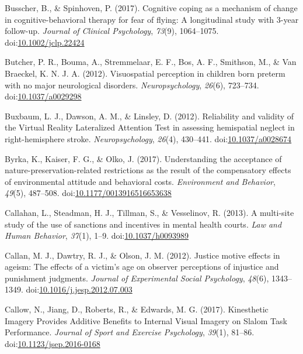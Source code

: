 \documentclass[english,man]{apa6}
\theoremstyle{definition}
\theoremstyle{definition}
\theoremstyle{definition}
\theoremstyle{remark}
\begin{document}
\hypertarget{ref-Busscher2017}{}
Busscher, B., \& Spinhoven, P. (2017). Cognitive coping as a mechanism
of change in cognitive-behavioral therapy for fear of flying: A
longitudinal study with 3-year follow-up. \emph{Journal of Clinical
Psychology}, \emph{73}(9), 1064--1075.
doi:\href{https://doi.org/10.1002/jclp.22424}{10.1002/jclp.22424}

\hypertarget{ref-Butcher2012}{}
Butcher, P. R., Bouma, A., Stremmelaar, E. F., Bos, A. F., Smithson, M.,
\& Van Braeckel, K. N. J. A. (2012). Visuospatial perception in children
born preterm with no major neurological disorders.
\emph{Neuropsychology}, \emph{26}(6), 723--734.
doi:\href{https://doi.org/10.1037/a0029298}{10.1037/a0029298}

\hypertarget{ref-Buxbaum}{}
Buxbaum, L. J., Dawson, A. M., \& Linsley, D. (2012). Reliability and
validity of the Virtual Reality Lateralized Attention Test in assessing
hemispatial neglect in right-hemisphere stroke. \emph{Neuropsychology},
\emph{26}(4), 430--441.
doi:\href{https://doi.org/10.1037/a0028674}{10.1037/a0028674}

\hypertarget{ref-Byrka2017}{}
Byrka, K., Kaiser, F. G., \& Olko, J. (2017). Understanding the
acceptance of nature-preservation-related restrictions as the result of
the compensatory effects of environmental attitude and behavioral costs.
\emph{Environment and Behavior}, \emph{49}(5), 487--508.
doi:\href{https://doi.org/10.1177/0013916516653638}{10.1177/0013916516653638}

\hypertarget{ref-Callahan2013}{}
Callahan, L., Steadman, H. J., Tillman, S., \& Vesselinov, R. (2013). A
multi-site study of the use of sanctions and incentives in mental health
courts. \emph{Law and Human Behavior}, \emph{37}(1), 1--9.
doi:\href{https://doi.org/10.1037/h0093989}{10.1037/h0093989}

\hypertarget{ref-Callan2012}{}
Callan, M. J., Dawtry, R. J., \& Olson, J. M. (2012). Justice motive
effects in ageism: The effects of a victim's age on observer perceptions
of injustice and punishment judgments. \emph{Journal of Experimental
Social Psychology}, \emph{48}(6), 1343--1349.
doi:\href{https://doi.org/10.1016/j.jesp.2012.07.003}{10.1016/j.jesp.2012.07.003}

\hypertarget{ref-Callow2017a}{}
Callow, N., Jiang, D., Roberts, R., \& Edwards, M. G. (2017).
Kinesthetic Imagery Provides Additive Benefits to Internal Visual
Imagery on Slalom Task Performance. \emph{Journal of Sport and Exercise
Psychology}, \emph{39}(1), 81--86.
doi:\href{https://doi.org/10.1123/jsep.2016-0168}{10.1123/jsep.2016-0168}
\end{document}
